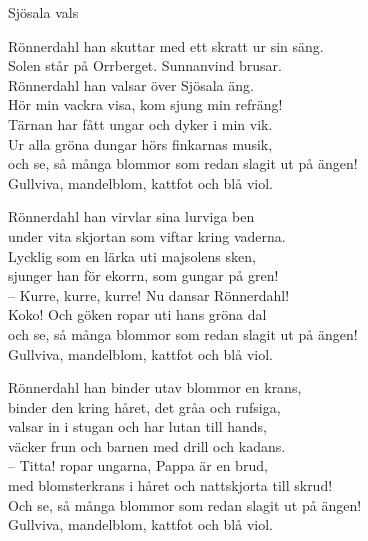\begin{song}{Sjösala vals}
	
	\vspace{-.1cm}
	

    \showversenumber	
	Rönnerdahl han skuttar med ett skratt ur sin säng.\\
	Solen står på Orrberget. Sunnanvind brusar.\\
	Rönnerdahl han valsar över Sjösala äng.\\
	Hör min vackra visa, kom sjung min refräng!\\
	Tärnan har fått ungar och dyker i min vik.\\
	Ur alla gröna dungar hörs finkarnas musik,\\
	och se, så många blommor som redan slagit ut på ängen!\\
	Gullviva, mandelblom, kattfot och blå viol.
	
	\vspace{-.05cm}
	
    \showversenumber
	Rönnerdahl han virvlar sina lurviga ben\\
	under vita skjortan som viftar kring vaderna.\\
	Lycklig som en lärka uti majsolens sken,\\
	sjunger han för ekorrn, som gungar på gren!\\
	-- Kurre, kurre, kurre! Nu dansar Rönnerdahl!\\
	Koko! Och göken ropar uti hans gröna dal\\
	och se, så många blommor som redan slagit ut på ängen!\\
	Gullviva, mandelblom, kattfot och blå viol.
	
	\vspace{-.05cm}
	
    \showversenumber
	Rönnerdahl han binder utav blommor en krans,\\
	binder den kring håret, det gråa och rufsiga,\\
	valsar in i stugan och har lutan till hands,\\
	väcker frun och barnen med drill och kadans.\\
	-- Titta! ropar ungarna, Pappa är en brud,\\
	med blomsterkrans i håret och nattskjorta till skrud!\\
	Och se, så många blommor som redan slagit ut på ängen!\\
	Gullviva, mandelblom, kattfot och blå viol.
	

\end{song}
